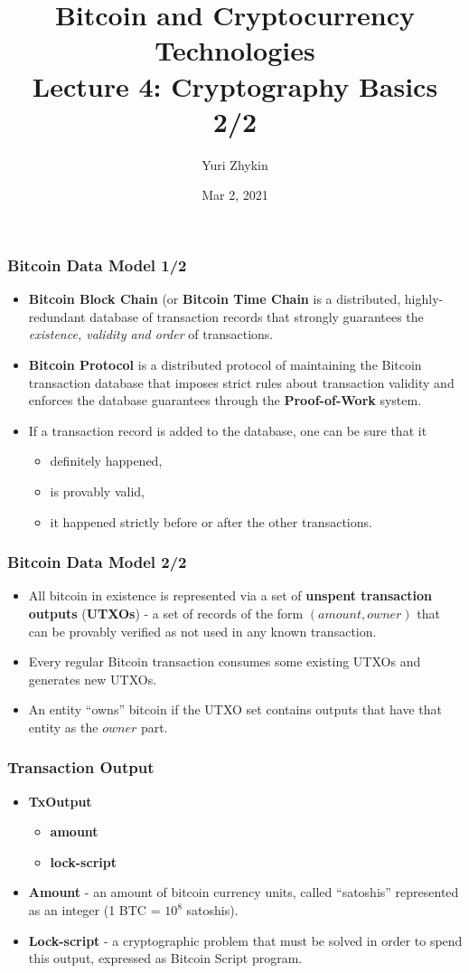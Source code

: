 \documentclass{beamer}
\title{
  Bitcoin and Cryptocurrency Technologies \\
  Lecture 4: Cryptography Basics 2/2
}
\author{Yuri Zhykin}
\date{Mar 2, 2021}
\begin{document}
\frame{\titlepage}

\begin{frame}
  \frametitle{Bitcoin Data Model 1/2}
  \begin{itemize}
  \item \textbf{Bitcoin Block Chain} (or \textbf{Bitcoin Time Chain} is a
    distributed, highly-redundant database of transaction records that strongly
    guarantees the \textit{existence, validity and order} of transactions.
  \item \textbf{Bitcoin Protocol} is a distributed protocol of maintaining the
    Bitcoin transaction database that imposes strict rules about transaction
    validity and enforces the database guarantees through the
    \textbf{Proof-of-Work} system.
  \item If a transaction record is added to the database, one can be sure that
    it 
    \begin{itemize}
    \item definitely happened,
    \item is provably valid,
    \item it happened strictly before or after the other transactions.
    \end{itemize}
  \end{itemize}
\end{frame}

\begin{frame}
  \frametitle{Bitcoin Data Model 2/2}
  \begin{itemize}
  \item All bitcoin in existence is represented via a set of \textbf{unspent
      transaction outputs} (\textbf{UTXOs}) - a set of records of the form
    $(amount, owner)$ that can be provably verified as not used in any
    known transaction.
  \item Every regular Bitcoin transaction consumes some existing UTXOs and
    generates new UTXOs.
  \item An entity ``owns'' bitcoin if the UTXO set contains outputs that have
    that entity as the $owner$ part.
  \end{itemize}
\end{frame}

\begin{frame}
  \frametitle{Transaction Output}
  \begin{itemize}
  \item \textbf{TxOutput}
    \begin{itemize}
    \item \textbf{amount}
    \item \textbf{lock-script}
    \end{itemize}
  \item \textbf{Amount} - an amount of bitcoin currency units, called
    ``satoshis'' represented as an integer (1 BTC = $10^8$ satoshis).
  \item \textbf{Lock-script} - a cryptographic problem that must be solved in
    order to spend this output, expressed as Bitcoin Script program.
  \end{itemize}
\end{frame}
\end{document}
